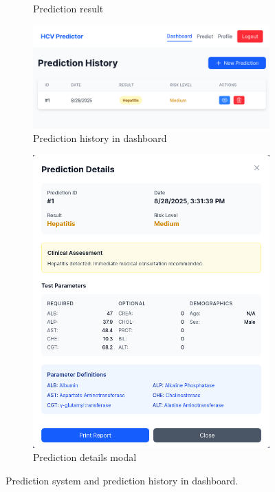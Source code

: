 \begin{figure}[htbp]
\begin{subfigure}{0.5\textwidth}
    \caption{Prediction result}
    \label{fig:prediction}
  \end{subfigure}
  \begin{subfigure}{0.5\textwidth}
    \includegraphics[width=\textwidth]{figures/site/dashboard.png}
    \caption{Prediction history in dashboard}
    \label{fig:dashboard}
  \end{subfigure}
  \begin{subfigure}{0.5\textwidth}
    \includegraphics[width=\textwidth]{figures/site/details.png}
    \caption{Prediction details modal}
    \label{fig:details}
  \end{subfigure}
  \caption{Prediction system and prediction history in dashboard.}
  \label{fig:image2}
\end{figure}

